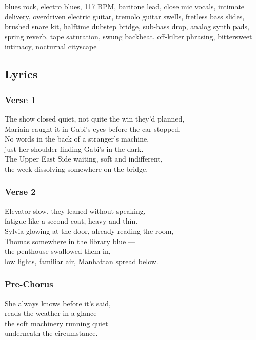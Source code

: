 \documentclass[]{article}
\begin{document}
blues rock, electro blues, 117 BPM, baritone lead, close mic vocals,
intimate delivery, overdriven electric guitar, tremolo guitar swells,
fretless bass slides, brushed snare kit, halftime dubstep bridge,
sub-bass drop, analog synth pads, spring reverb, tape saturation, swung
backbeat, off-kilter phrasing, bittersweet intimacy, nocturnal cityscape

\subsection{Lyrics}\label{lyrics-40}

\subsubsection{Verse 1}\label{verse-1-24}

The show closed quiet, not quite the win they'd planned,\\
Mariain caught it in Gabi's eyes before the car stopped.\\
No words in the back of a stranger's machine,\\
just her shoulder finding Gabi's in the dark.\\
The Upper East Side waiting, soft and indifferent,\\
the week dissolving somewhere on the bridge.

\subsubsection{Verse 2}\label{verse-2-21}

Elevator slow, they leaned without speaking,\\
fatigue like a second coat, heavy and thin.\\
Sylvia glowing at the door, already reading the room,\\
Thomas somewhere in the library blue ---\\
the penthouse swallowed them in,\\
low lights, familiar air, Manhattan spread below.

\subsubsection{Pre-Chorus}\label{pre-chorus-41}

She always knows before it's said,\\
reads the weather in a glance ---\\
the soft machinery running quiet\\
underneath the circumstance.
\end{document}
